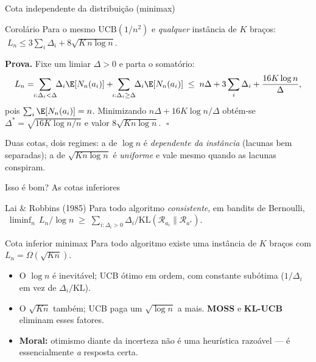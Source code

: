 \documentclass[aspectratio=169, 11pt]{beamer}
\newcommand{\ucb}{\mathrm{UCB}}
\newcommand{\Dist}{\mathcal{R}}
\begin{document}
\begin{frame}{Cota independente da distribuição (minimax)}
  \begin{teobox}{Corolário}
    Para o mesmo $\ucb(1/n^{2})$ e \emph{qualquer} instância de $K$ braços:
    $\;L_n \le 3\sum_{i}\Delta_i + 8\sqrt{K\,n\log n}$.
  \end{teobox}

  {\small\textbf{Prova.} Fixe um limiar $\Delta>0$ e parta o somatório:
  \[
    L_n = \!\!\sum_{i:\Delta_i<\Delta}\!\!\Delta_i\E[N_n(a_i)]
        + \!\!\sum_{i:\Delta_i\ge\Delta}\!\!\Delta_i\E[N_n(a_i)]
      \;\le\; n\Delta + 3\sum_i\Delta_i + \frac{16K\log n}{\Delta},
  \]
  pois $\sum_i \E[N_n(a_i)]=n$. Minimizando $n\Delta + 16K\log n/\Delta$
  obtém-se $\Delta^{*}=\sqrt{16K\log n/n}$ e valor $8\sqrt{Kn\log n}$.
  $\;\square$}

  \begin{ideiabox}
    Duas cotas, dois regimes: a de $\log n$ é \emph{dependente da instância}
    (lacunas bem separadas); a de $\sqrt{Kn\log n}$ é \emph{uniforme} e vale
    mesmo quando as lacunas conspiram.
  \end{ideiabox}
\end{frame}

\begin{frame}{Isso é bom? As cotas inferiores}
  \begin{teobox}{Lai \& Robbins (1985)}
    Para todo algoritmo \emph{consistente}, em bandits de Bernoulli,
    $\;\liminf_{n}\, L_n/\log n \;\ge\; \sum_{i:\Delta_i>0}
      \Delta_i / \mathrm{KL}(\Dist_{a_i}\|\Dist_{a^{*}})$.
  \end{teobox}
  \vspace{-0.3em}
  \begin{teobox}{Cota inferior minimax}
    Para todo algoritmo existe uma instância de $K$ braços com
    $L_n = \Omega(\sqrt{Kn})$.
  \end{teobox}

  {\small
  \begin{itemize}\setlength{\itemsep}{0.2ex}
    \item O $\log n$ é \alert{inevitável}; UCB ótimo em ordem, com constante
          subótima ($1/\Delta_i$ em vez de $\Delta_i/\mathrm{KL}$).
    \item O $\sqrt{Kn}$ também; UCB paga um $\sqrt{\log n}$ a mais.
          \textbf{MOSS} e \textbf{KL-UCB} eliminam esses fatores.
    \item \textbf{Moral:} otimismo diante da incerteza não é uma heurística
          razoável --- é essencialmente \emph{a} resposta certa.
  \end{itemize}}
\end{frame}
\end{document}
